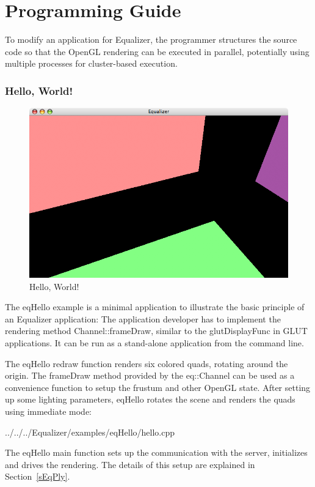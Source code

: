 \documentclass[10pt,a4]{scrartcl}
\newcommand{\sref}[1]{Section~\ref{#1}}
\begin{document}
\clearpage
\part{Programming Guide}

To modify an application for Equalizer, the programmer structures the
source code so that the OpenGL rendering can be executed in parallel,
potentially using multiple processes for cluster-based execution.

\section{Hello, World!}

\begin{figure}
  \includegraphics[width=.618\textwidth]{images/eqHello.png}
  {\caption{\label{fHello}Hello, World!}}
\end{figure}
The \textsf{eqHello} example is a minimal application to illustrate the
basic principle of an Equalizer application: The application developer
has to implement the rendering method \textsf{Channel::frameDraw},
similar to the \textsf{glutDisplayFunc} in GLUT applications. It can be
run as a stand-alone application from the command line.

The \textsf{eqHello} redraw function renders six colored quads, rotating
around the origin. The \textsf{frameDraw} meth\-od provided by the
\textsf{eq::Channel} can be used as a convenience function to setup the
frustum and other OpenGL state. After setting up some lighting
parameters, \textsf{eqHello} rotates the scene and renders the quads
using immediate mode:

{\footnotesize
  {../../../Equalizer/examples/eqHello/hello.cpp}}

The \textsf{eqHello} main function sets up the communication with the
server, initializes and drives the rendering. The details of this setup
are explained in \sref{sEqPly}.
\end{document}
